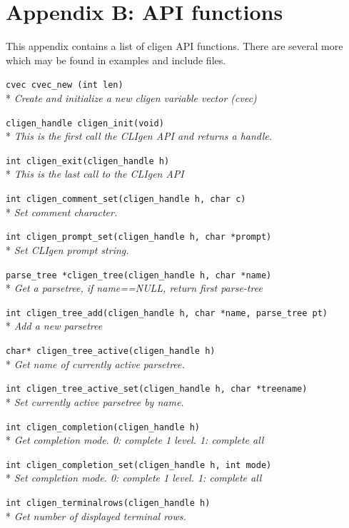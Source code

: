 \documentclass[a4paper, 10pt] {article}
\begin{document}
\newpage
\section*{Appendix B: API functions}
\label{app:functions}

This appendix contains a list of cligen API functions. There are several more which may be found in examples and include files.
\small

{\tt cvec cvec\-\_\-new (int len)}\\*
\emph{Create and initialize a new cligen variable vector (cvec)}

{\tt cligen\_handle cligen\_init(void)}\\*
\emph{This is the first call the CLIgen API and returns a handle. }

{\tt int cligen\_exit(cligen\_handle h)}\\*
\emph{ This is the last call to the CLIgen API}

{\tt int cligen\_comment\_set(cligen\_handle h, char c)}\\*
\emph{ Set comment character.}

{\tt int cligen\_prompt\_set(cligen\_handle h, char *prompt)}\\*
\emph{ Set CLIgen prompt string.}

{\tt parse\_tree *cligen\_tree(cligen\_handle h, char *name)}\\*
\emph{ Get a parsetree, if name==NULL, return first parse-tree}

{\tt int cligen\_tree\_add(cligen\_handle h, char *name, parse\_tree pt)}\\*
\emph{ Add a new parsetree}

{\tt char* cligen\_tree\_active(cligen\_handle h)}\\*
\emph{ Get name of currently active parsetree.}

{\tt int cligen\_tree\_active\_set(cligen\_handle h, char *treename)}\\*
\emph{ Set currently active parsetree by name.}

{\tt int cligen\_completion(cligen\_handle h)}\\*
\emph{ Get completion mode. 0: complete 1 level. 1: complete all}

{\tt int cligen\_completion\_set(cligen\_handle h, int mode)}\\*
\emph{ Set completion mode. 0: complete 1 level. 1: complete all}

{\tt int cligen\_terminalrows(cligen\_handle h)}\\*
\emph{ Get number of displayed terminal rows.}
\end{document}
